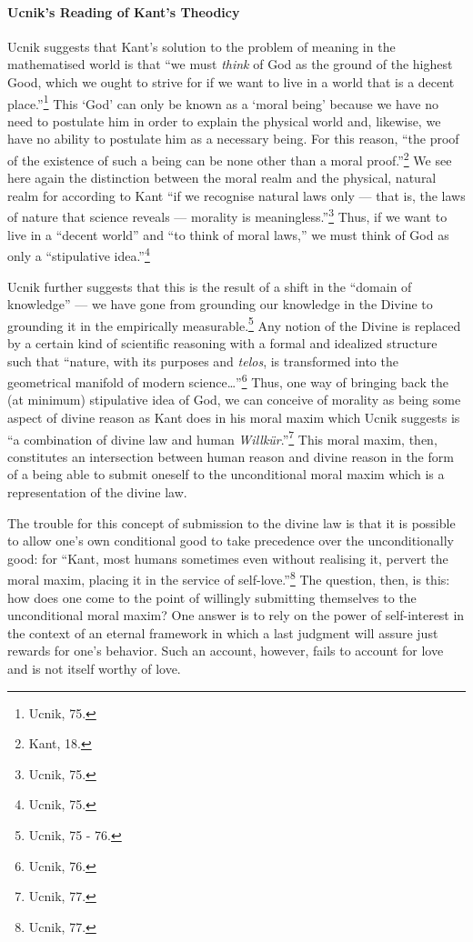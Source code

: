 \documentclass[12pt]{article}
\begin{document}
	\paragraph*{Ucnik's Reading of Kant's Theodicy}  Ucnik suggests that Kant's solution to the problem of meaning in the mathematised world is that ``we must \emph{think} of God as the ground of the highest Good, which we ought to strive for if we want to live in a world that is a decent place.''\footnote{Ucnik, 75.} This `God' can only be known as a `moral being' because we have no need to postulate him in order to explain the physical world and, likewise, we have no ability to postulate him as a necessary being. For this reason, ``the proof of the existence of such a being can be none other than a moral proof.''\footnote{Kant, 18.} We see here again the distinction between the moral realm and the physical, natural realm for according to Kant ``if we recognise natural laws only --- that is, the laws of nature that science reveals --- morality is meaningless.''\footnote{Ucnik, 75.} Thus, if we want to live in a ``decent world'' and ``to think of moral laws,'' we must think of God as only a ``stipulative idea.''\footnote{Ucnik, 75.} 
	
	Ucnik further suggests that this is the result of a shift in the ``domain of knowledge'' --- we have gone from grounding our knowledge in the Divine to grounding it in the empirically measurable.\footnote{Ucnik, 75 - 76.} Any notion of the Divine is replaced by a certain kind of scientific reasoning with a formal and idealized structure such that ``nature, with its purposes and \emph{telos}, is transformed into the geometrical manifold of modern science\ldots''\footnote{Ucnik, 76.} Thus, one way of bringing back the (at minimum) stipulative idea of God, we can conceive of morality as being some aspect of divine reason as Kant does in his moral maxim which Ucnik suggests is ``a combination of divine law and human \emph{Willk\"{u}r}.''\footnote{Ucnik, 77.} This moral maxim, then, constitutes an intersection between human reason and divine reason in the form of a being able to submit oneself to the unconditional moral maxim which is a representation of the divine law. 
	
	The trouble for this concept of submission to the divine law is that it is possible to allow one's own conditional good to take precedence over the unconditionally good: for ``Kant, most humans sometimes even without realising it, pervert the moral maxim, placing it in the service of self-love.''\footnote{Ucnik, 77.} The question, then, is this: how does one come to the point of willingly submitting themselves to the unconditional moral maxim? One answer is to rely on the power of self-interest in the context of an eternal framework in which a last judgment will assure just rewards for one's behavior. Such an account, however, fails to account for love and is not itself worthy of love. 
	
\end{document}
